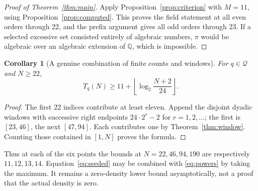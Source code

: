 \documentclass[11pt,a4paper]{article}
\newtheorem{corollary}[theorem]{Corollary}
\theoremstyle{definition}\newtheorem{definition}[theorem]{Definition}
\theoremstyle{remark}\newtheorem{remark}[theorem]{Remark}
\newcommand{\Q}{\mathbb Q}\newcommand{\Qb}{\overline{\mathbb Q}}
\begin{document}
\begin{proof}[Proof of Theorem~\ref{thm:main}]
Apply Proposition~\ref{prop:criterion} with $M=11$, using Proposition~\ref{prop:computed}. This proves the field statement at all even orders through 22, and the prefix argument gives all odd orders through 23. If a selected excessive set consisted entirely of algebraic numbers, $\pi$ would be algebraic over an algebraic extension of $\Q$, which is impossible.
\end{proof}

\begin{corollary}[A genuine combination of finite counts and windows]\label{cor:combined}
For $q\in\mathcal Q$ and $N\ge22$,
\begin{equation}\label{eq:seeded}
T_q(N)\ge11+\left\lfloor\log_2\frac{N+2}{24}\right\rfloor.
\end{equation}
\end{corollary}
\begin{proof}
The first 22 indices contribute at least eleven. Append the disjoint dyadic windows with successive right endpoints $24\cdot2^r-2$ for $r=1,2,\ldots$; the first is $[23,46]$, the next $[47,94]$. Each contributes one by Theorem~\ref{thm:window}. Counting those contained in $[1,N]$ proves the formula.
\end{proof}
Thus at each of the six points the bounds at $N=22,46,94,190$ are respectively $11,12,13,14$. Equation~\eqref{eq:seeded} may be combined with \eqref{eq:powers} by taking the maximum. It remains a zero-density lower bound asymptotically, not a proof that the actual density is zero.
\end{document}
